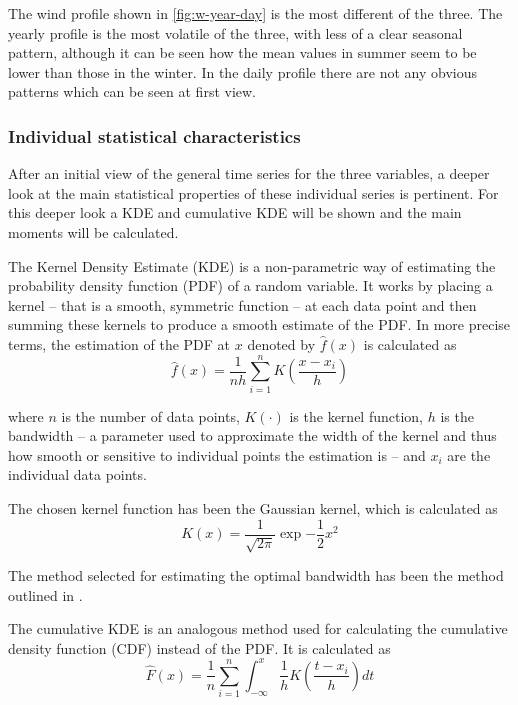 The wind profile shown in \autoref{fig:w-year-day} is the most different of the three. The yearly profile is the most volatile of the three, with less of a clear seasonal pattern, although it can be seen how the mean values in summer seem to be lower than those in the winter. In the daily profile there are not any obvious patterns which can be seen at first view. 

\subsubsection{Individual statistical characteristics}
\label{s:individual-statistical-characteristics}
After an initial view of the general time series for the three variables, a deeper look at the main statistical properties of these individual series is pertinent. For this deeper look a KDE and cumulative KDE will be shown and the main moments will be calculated. 

The Kernel Density Estimate (KDE) is a non-parametric way of estimating the probability density function (PDF) of a random variable. It works by placing a kernel -- that is a smooth, symmetric function -- at each data point and then summing these kernels to produce a smooth estimate of the PDF. In more precise terms, the estimation of the PDF at $x$ denoted by $\hat{f}\left(x\right)$ is calculated as
\begin{equation}
    \hat{f}\left(x\right)=\frac{1}{nh}\sum^n_{i=1}K\left(\frac{x-x_i}{h}\right)
\end{equation}

where $n$ is the number of data points, $K\left(\cdot\right)$ is the kernel function, $h$ is the bandwidth -- a parameter used to approximate the width of the kernel and thus how smooth or sensitive to individual points the estimation is -- and $x_i$ are the individual data points.

The chosen kernel function has been the Gaussian kernel, which is calculated as 
\begin{equation}
    K\left(x\right)=\frac{1}{\sqrt{2\pi}}\exp{-\frac{1}{2}x^2}
\end{equation}

The method selected for estimating the optimal bandwidth has been the method outlined in \cite{scott_1979}. 

The cumulative KDE is an analogous method used for calculating the cumulative density function (CDF) instead of the PDF. It is calculated as
\begin{equation}
    \label{eq:cumulative-kde}
    \hat{F}\left(x\right)=\frac{1}{n}\sum^n_{i=1}\int_{-\infty}^{x}\frac{1}{h}K\left(\frac{t-x_i}{h}\right)dt
\end{equation}

